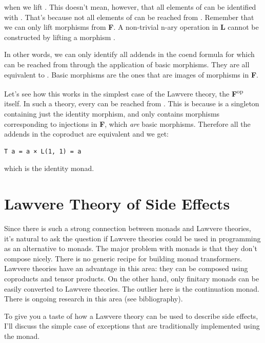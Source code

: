 when we lift . This doesn't
mean, however, that all elements of  can be
identified with . That's because not all elements
of  can be reached from . Remember
that we can only lift morphisms from \textbf{F}. A non-trivial n-ary
operation in \textbf{L} cannot be constructed by lifting a morphism
.

In other words, we can only identify all addends in the coend formula
for which  can be reached from 
through the application of basic morphisms. They are all equivalent to
. Basic morphisms are the ones that are images of
morphisms in \textbf{F}.

Let's see how this works in the simplest case of the Lawvere theory, the
\textbf{F}\textsuperscript{op} itself. In such a theory, every
 can be reached from . This is because
 is a singleton containing just the identity morphism,
and  only contains morphisms corresponding to
injections  in \textbf{F}, which \emph{are}
basic morphisms. Therefore all the addends in the coproduct are
equivalent and we get:

\begin{verbatim}
T a = a × L(1, 1) = a
\end{verbatim}

which is the identity monad.

\section{Lawvere Theory of Side
Effects}\label{lawvere-theory-of-side-effects}

Since there is such a strong connection between monads and Lawvere
theories, it's natural to ask the question if Lawvere theories could be
used in programming as an alternative to monads. The major problem with
monads is that they don't compose nicely. There is no generic recipe for
building monad transformers. Lawvere theories have an advantage in this
area: they can be composed using coproducts and tensor products. On the
other hand, only finitary monads can be easily converted to Lawvere
theories. The outlier here is the continuation monad. There is ongoing
research in this area (see bibliography).

To give you a taste of how a Lawvere theory can be used to describe side
effects, I'll discuss the simple case of exceptions that are
traditionally implemented using the  monad.

